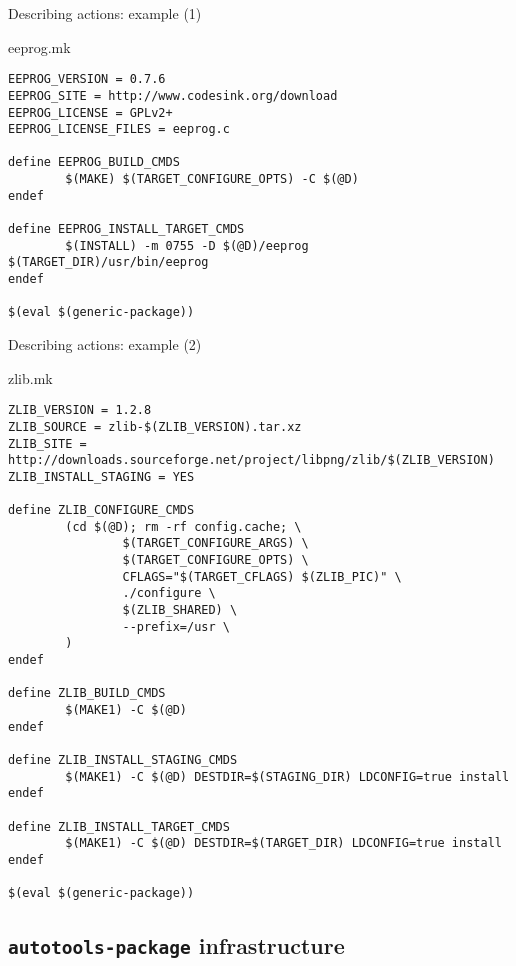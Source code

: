 \begin{frame}[fragile]{Describing actions: example (1)}
  \begin{block}{eeprog.mk}
    \begin{verbatim}
EEPROG_VERSION = 0.7.6
EEPROG_SITE = http://www.codesink.org/download
EEPROG_LICENSE = GPLv2+
EEPROG_LICENSE_FILES = eeprog.c

define EEPROG_BUILD_CMDS
        $(MAKE) $(TARGET_CONFIGURE_OPTS) -C $(@D)
endef

define EEPROG_INSTALL_TARGET_CMDS
        $(INSTALL) -m 0755 -D $(@D)/eeprog $(TARGET_DIR)/usr/bin/eeprog
endef

$(eval $(generic-package))
    \end{verbatim}
  \end{block}
\end{frame}

\begin{frame}[fragile]{Describing actions: example (2)}
  \begin{block}{zlib.mk}
    \begin{verbatim}
ZLIB_VERSION = 1.2.8
ZLIB_SOURCE = zlib-$(ZLIB_VERSION).tar.xz
ZLIB_SITE = http://downloads.sourceforge.net/project/libpng/zlib/$(ZLIB_VERSION)
ZLIB_INSTALL_STAGING = YES

define ZLIB_CONFIGURE_CMDS
        (cd $(@D); rm -rf config.cache; \
                $(TARGET_CONFIGURE_ARGS) \
                $(TARGET_CONFIGURE_OPTS) \
                CFLAGS="$(TARGET_CFLAGS) $(ZLIB_PIC)" \
                ./configure \
                $(ZLIB_SHARED) \
                --prefix=/usr \
        )
endef

define ZLIB_BUILD_CMDS
        $(MAKE1) -C $(@D)
endef

define ZLIB_INSTALL_STAGING_CMDS
        $(MAKE1) -C $(@D) DESTDIR=$(STAGING_DIR) LDCONFIG=true install
endef

define ZLIB_INSTALL_TARGET_CMDS
        $(MAKE1) -C $(@D) DESTDIR=$(TARGET_DIR) LDCONFIG=true install
endef

$(eval $(generic-package))
    \end{verbatim}
  \end{block}
\end{frame}

\subsection{{\tt autotools-package} infrastructure}

